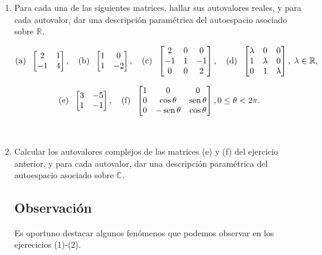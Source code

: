 \documentclass[12pt]{amsart}
\begin{document}
\begin{enumerate}


\item Para cada una de las siguientes matrices, hallar sus autovalores reales, y para cada autovalor, dar una descripci\' on param\'etrica del autoespacio asociado sobre $\mathbb{R}$.


$$\textrm{(a)\; } \left[\begin{matrix} 2 & 1\\ -1 & 4 \end{matrix} \right],
\quad
\textrm{(b)\; }
\left[\begin{matrix} 1 & 0\\ 1 & -2 \end{matrix} \right],
\quad \textrm{(c)\; } \left[\begin{matrix}2 & 0 & 0\\ -1 & 1& -1\\ 0 & 0 & 2 \end{matrix} \right] ,
\quad
\textrm{(d)\; } \begin{bmatrix} \lambda & 0 & 0 \\ 1 & \lambda & 0\\ 0 & 1 & \lambda \\ \end{bmatrix}, \; \lambda\in \mathbb R,$$


$$\textrm{(e)\; } \begin{bmatrix} 3 & -5 \\ 1 & -1 \end{bmatrix},
\quad
\textrm{(f)\; } \left[\begin{matrix}1 & 0& 0 \\ 0 & \cos\theta & \operatorname{sen}\theta\\ 0 & -\operatorname{sen}\theta & \cos\theta \end{matrix} \right], 0\leq \theta<2\pi.
$$

\

\item Calcular los autovalores complejos de las matrices (e) y (f) del ejercicio anterior, y para cada autovalor, dar una descripci\' on param\'etrica del autoespacio asociado sobre $\mathbb{C}$.


\subsection*{Observaci\'{o}n} Es oportuno destacar algunos fen\'omenos que podemos observar en los ejerecicios (1)-(2).


\end{enumerate}
\end{document}
